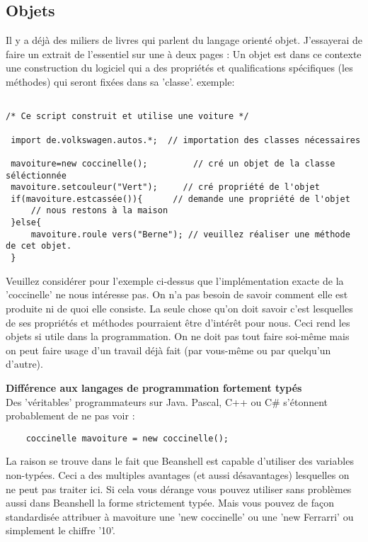 \documentclass[a4paper]{scrartcl}
\begin{document}
\subsection{Objets}
Il y a déjà des miliers de livres qui parlent du langage orienté objet. J'essayerai de faire un extrait de l'essentiel sur une à deux pages :
Un objet est dans ce contexte une construction du logiciel qui a des propriétés et qualifications spécifiques (les méthodes) qui seront fixées dans sa 'classe'.  exemple:

\begin{small}
\begin{verbatim}

/* Ce script construit et utilise une voiture */

 import de.volkswagen.autos.*;  // importation des classes nécessaires

 mavoiture=new coccinelle();         // cré un objet de la classe séléctionnée
 mavoiture.setcouleur("Vert");     // cré propriété de l'objet
 if(mavoiture.estcassée()){      // demande une propriété de l'objet
     // nous restons à la maison
 }else{
     mavoiture.roule vers("Berne"); // veuillez réaliser une méthode de cet objet.
 }

\end{verbatim}
\end{small}

Veuillez considérer pour l'exemple ci-dessus que l'implémentation exacte de la 'coccinelle' ne nous intéresse pas. On n'a pas besoin de savoir comment elle est produite ni de quoi elle consiste. La seule chose qu'on doit savoir c'est lesquelles de ses propriétés et méthodes pourraient être d'intérêt pour nous.
Ceci rend les objets si utile dans la programmation. On ne doit pas tout faire soi-même mais on peut faire usage d'un travail déjà fait (par vous-même ou par quelqu'un d'autre).

\medskip

\hrulefill

\textbf{Différence aux langages de programmation fortement typés}\\
Des 'véritables' programmateurs sur Java. Pascal, C++ ou C\# s'étonnent probablement de ne pas voir :
\begin{small}
\begin{verbatim}
    coccinelle mavoiture = new coccinelle();
\end{verbatim}
\end{small}

La raison se trouve dans le fait que Beanshell est capable d'utiliser des variables non-typées. Ceci a des multiples avantages (et aussi désavantages) lesquelles on ne peut pas traiter ici. Si cela vous dérange vous pouvez utiliser sans problèmes aussi dans Beanshell la forme strictement typée. Mais vous pouvez de façon standardisée attribuer à mavoiture une 'new coccinelle' ou une 'new Ferrarri' ou simplement le chiffre '10'.
\hrulefill
\end{document}
